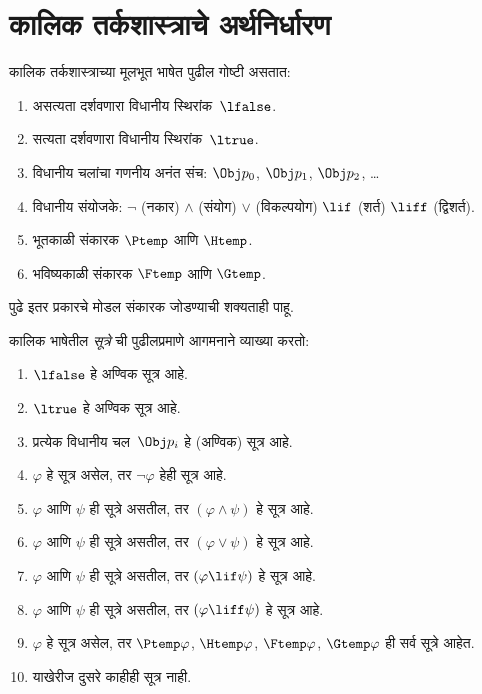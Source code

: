 \section{कालिक तर्कशास्त्राचे अर्थनिर्धारण}\label{aml:tl:sem:sec}
\begin{defn}
कालिक तर्कशास्त्राच्या मूलभूत भाषेत पुढील गोष्टी असतात:
\begin{enumerate}
  \item असत्यता दर्शवणारा विधानीय स्थिरांक~$\lfalse$.
  \item सत्यता दर्शवणारा विधानीय स्थिरांक~$\ltrue$.
  \item विधानीय चलांचा गणनीय अनंत संच: $\Obj
    p_0$, $\Obj p_1$, $\Obj p_2$, \dots
  \item विधानीय संयोजके: \startycommalist
  \ycomma $\lnot$ (नकार)
  \ycomma $\land$ (संयोग)
  \ycomma $\lor$ (विकल्पयोग)
  \ycomma $\lif$ (शर्त)
  \ycomma $\liff$ (द्विशर्त).
  \item भूतकाळी संकारक $\Ptemp$ आणि $\Htemp$.
  \item भविष्यकाळी संकारक $\Ftemp$ आणि $\Gtemp$.
\end{enumerate}
\end{defn}
पुढे इतर प्रकारचे मोडल संकारक जोडण्याची शक्यताही पाहू.
\begin{defn}
कालिक भाषेतील \emph{सूत्रे} ची पुढीलप्रमाणे
  आगमनाने व्याख्या करतो:
\begin{enumerate}
\item $\lfalse$ हे अण्विक सूत्र आहे.
\item $\ltrue$ हे अण्विक सूत्र आहे.
\item प्रत्येक विधानीय चल~$\Obj p_i$ हे (अण्विक) सूत्र आहे.
\item $\varphi$ हे सूत्र असेल, तर $\lnot \varphi$
  हेही सूत्र आहे.
\item $\varphi$ आणि $\psi$ ही सूत्रे असतील, तर $(\varphi \land
  \psi)$ हे सूत्र आहे.
\item $\varphi$ आणि $\psi$ ही सूत्रे असतील, तर $(\varphi \lor \psi)$
  हे सूत्र आहे.
\item $\varphi$ आणि $\psi$ ही सूत्रे असतील, तर $(\varphi \lif \psi)$
  हे सूत्र आहे.
\item $\varphi$ आणि $\psi$ ही सूत्रे असतील, तर $(\varphi \liff \psi)$
  हे सूत्र आहे.
\item $\varphi$ हे सूत्र असेल, तर $\Ptemp  \varphi$, $\Htemp  \varphi$, $\Ftemp \varphi$, $\Gtemp  \varphi$
  ही सर्व सूत्रे आहेत.
\item याखेरीज दुसरे काहीही सूत्र नाही.
\end{enumerate}
\end{defn}
